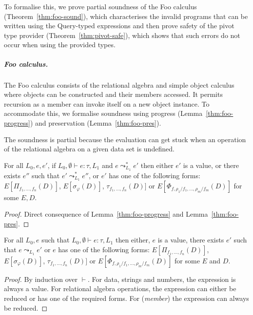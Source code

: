 \documentclass[a4paper,UKenglish]{lipics-v2016}
\theoremstyle{plain}
\theoremstyle{definition}
\newcommand{\ident}[1]{\textnormal{\sffamily #1}}
\begin{document}
To formalise this, we prove partial soundness of the Foo calculus (Theorem~\ref{thm:foo-sound}),
which characterises the invalid programs that can be written using the \ident{Query}-typed 
expressions and then prove safety of the pivot type provider (Theorem~\ref{thm:pivot-safe}),
which shows that such errors do not occur when using the provided types. 

\subparagraph{Foo calculus.} The Foo calculus consists of the relational algebra and simple object
calculus where objects can be constructed and their members accessed. It permits recursion as a
member can invoke itself on a new object instance. To accommodate this, we formalise soundness 
using progress (Lemma~\ref{thm:foo-progress}) and preservation (Lemma~\ref{thm:foo-pres}). 

The soundness is partial because the evaluation can get stuck when an operation of the relational 
algebra on a given data set is undefined. 

\begin{theorem}
\label{thm:foo-sound}
For all $L_0, e, e'$, if $L_0, \emptyset \vdash e : \tau, L_1$ and $e\leadsto_{L_1}^{*} e'$ 
then either $e'$ is a value, or there exists $e''$ such that $e'\leadsto_{L_1}^{*} e''$, or
$e'$ has one of the following forms:
$E[\Pi_{f_1, \ldots, f_n}(D)]$, $E[\sigma_\varphi(D)]$, $\tau_{f_1, \ldots, f_n}(D)]$ or 
$E[\Phi_{f, \rho_1/f_1, \ldots, \rho_m/f_m} (D)]$ for some $E, D$.
\end{theorem}
\begin{proof}
Direct consequence of Lemma~\ref{thm:foo-progress} and Lemma~\ref{thm:foo-pres}.
\end{proof}

\begin{lemma}
\label{thm:foo-progress}
For all $L_0, e$ such that $L_0, \emptyset \vdash e : \tau, L_1$ then either, $e$ is a value,
there exists $e'$ such that $e\leadsto_{L_1} e'$ or $e$ has one of
the following forms: $E[\Pi_{f_1, \ldots, f_n}(D)]$, $E[\sigma_\varphi(D)]$, $\tau_{f_1, \ldots, f_n}(D)]$ 
or $E[\Phi_{f, \rho_1/f_1, \ldots, \rho_m/f_m} (D)]$ for some $E$ and $D$.
\end{lemma}
\begin{proof}
By induction over $\vdash$. For data, strings and numbers, the expression is always a value. 
For relational algebra operations, the expression can either be reduced or has one of the required 
forms. For (\emph{member}) the expression can always be reduced.
\end{proof}
\end{document}
